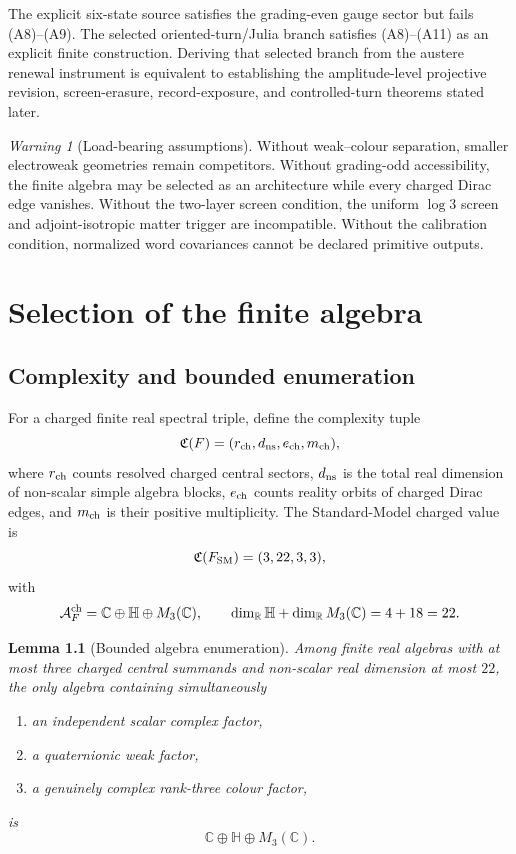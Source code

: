 \documentclass[11pt,oneside,openany]{book}
\numberwithin{equation}{chapter}
\newtheorem{lemma}[theorem]{Lemma}
\theoremstyle{definition}
\theoremstyle{remark}
\newtheorem{warning}[theorem]{Warning}
\newcommand{\C}{\mathbb C}
\newcommand{\R}{\mathbb R}
\newcommand{\HH}{\mathbb H}
\newcommand{\AF}{\mathcal A_F}
\begin{document}
The explicit six-state source satisfies the grading-even gauge sector but
fails (A8)--(A9).  The selected oriented-turn/Julia branch satisfies
(A8)--(A11) as an explicit finite construction.  Deriving that selected
branch from the austere renewal instrument is equivalent to establishing the
amplitude-level projective revision, screen-erasure, record-exposure, and
controlled-turn theorems stated later.

\begin{warning}[Load-bearing assumptions]
Without weak--colour separation, smaller electroweak geometries remain
competitors.  Without grading-odd accessibility, the finite algebra may be
selected as an architecture while every charged Dirac edge vanishes.
Without the two-layer screen condition, the uniform \(\log3\) screen and
adjoint-isotropic matter trigger are incompatible.  Without the calibration
condition, normalized word covariances cannot be declared primitive outputs.
\end{warning}

\chapter{Selection of the finite algebra}
\label{ch:finite-algebra}

\section{Complexity and bounded enumeration}
For a charged finite real spectral triple, define the complexity tuple
\[
 \mathfrak C(F)=(r_{\rm ch},d_{\rm ns},e_{\rm ch},m_{\rm ch}),
\]
where $r_{\rm ch}$ counts resolved charged central sectors, $d_{\rm ns}$ is the total real dimension of non-scalar simple algebra blocks, $e_{\rm ch}$ counts reality orbits of charged Dirac edges, and $m_{\rm ch}$ is their positive multiplicity.  The Standard-Model charged value is
\[
 \mathfrak C(F_{\rm SM})=(3,22,3,3),
\]
with
\[
 \AF^{\rm ch}=\C\oplus\HH\oplus M_3(\C),
 \qquad
 \dim_\R\HH+\dim_\R M_3(\C)=4+18=22.
\]

\begin{lemma}[Bounded algebra enumeration]
\label{lem:algebra-enumeration}
Among finite real algebras with at most three charged central summands and non-scalar real dimension at most $22$, the only algebra containing simultaneously
\begin{enumerate}[label=\textup{(\roman*)},leftmargin=2.2em]
\item an independent scalar complex factor,
\item a quaternionic weak factor,
\item a genuinely complex rank-three colour factor,
\end{enumerate}
is
\[
 \boxed{\C\oplus\HH\oplus M_3(\C).}
\]
\end{lemma}
\end{document}
